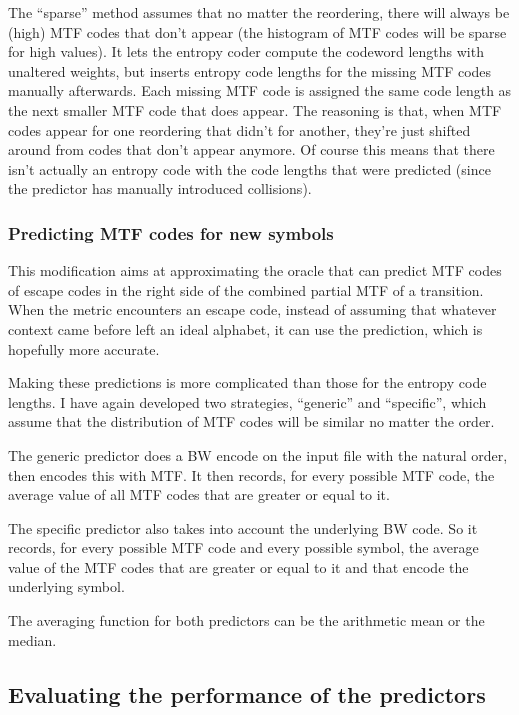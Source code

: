 \documentclass[a4paper]{scrreprt}
\begin{document}
The ``sparse'' method assumes that no matter the reordering, there will always
be (high) MTF codes that don't appear (the histogram of MTF codes will be
sparse for high values).
It lets the entropy coder compute the codeword lengths with unaltered weights,
but inserts entropy code lengths for the missing MTF codes manually afterwards.
Each missing MTF code is assigned the same code length as the next smaller MTF
code that does appear. The reasoning is that, when MTF codes appear for one
reordering that didn't for another, they're just shifted around from codes that
don't appear anymore. Of course this means that there isn't actually an entropy
code with the code lengths that were predicted (since the predictor has
manually introduced collisions).

\subsubsection{Predicting MTF codes for new symbols}

This modification aims at approximating the oracle that can predict MTF codes of
escape codes in the right side of the combined partial MTF of a transition. When
the metric encounters an escape code, instead of assuming that whatever
context came before left an ideal alphabet, it can use the prediction, which is
hopefully more accurate.

Making these predictions is more complicated than those for the entropy code
lengths. I have again developed two strategies, ``generic'' and ``specific'',
which assume that the distribution of MTF codes will be similar no matter the
order.

The generic predictor does a BW encode on the input file with the natural order,
then encodes this with MTF. It then records, for every possible MTF code, the
average value of all MTF codes that are greater or equal to it.

The specific predictor also takes into account the underlying BW code. So it
records, for every possible MTF code and every possible symbol, the average
value of the MTF codes that are greater or equal to it and that encode the
underlying symbol.

The averaging function for both predictors can be the arithmetic mean or the
median.

\subsection{Evaluating the performance of the predictors}
\end{document}
